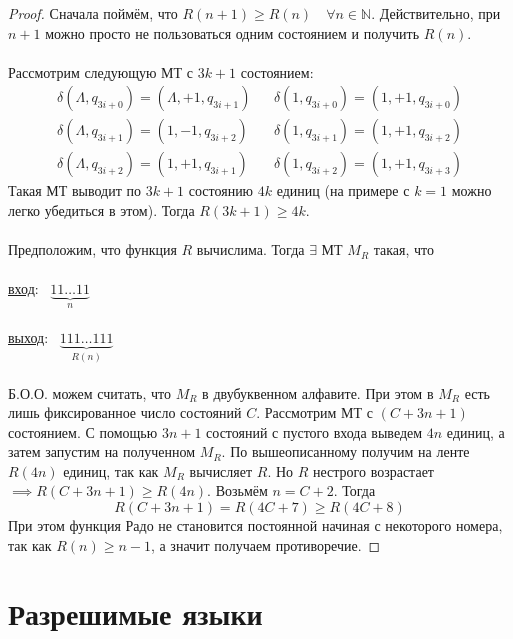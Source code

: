 \documentclass[11pt]{article}
\begin{document}
\begin{proof}
  Сначала поймём, что $R(n + 1) \geq R(n) \quad \forall n \in \mathbb{N}$. 
  Действительно, при $n + 1$ можно просто не пользоваться одним состоянием 
  и получить $R(n)$. \\ \\
  Рассмотрим следующую МТ с $3k + 1$ состоянием:
  \[\begin{array}{lll}
    \delta (\varLambda, q_{3i + 0}) = (\varLambda, +1, q_{3i + 1}) & & 
    \delta (1, q_{3i + 0}) = (1, +1, q_{3i + 0}) \\
    \delta (\varLambda, q_{3i + 1}) = (1, -1, q_{3i + 2}) & &
    \delta (1, q_{3i + 1}) = (1, +1, q_{3i + 2}) \\
    \delta (\varLambda, q_{3i + 2}) = (1, +1, q_{3i + 1}) & & 
    \delta (1, q_{3i + 2}) = (1, +1, q_{3i + 3})
  \end{array}\]
  Такая МТ выводит по $3k + 1$ состоянию $4k$ единиц (на примере с $k = 1$ 
  можно легко убедиться в этом). Тогда $R(3k + 1) \geq 4k$. \\ \\
  Предположим, что функция $R$ вычислима. Тогда $\exists$ МТ $M_R$ такая, что \\ \\
  \underline{вход}: \ $\underbrace{11 \ldots 11}_{n}$ \\ \\
  \underline{выход}: \ $\underbrace{111 \ldots 111}_{R(n)}$ \\ \\
  Б.О.О. можем считать, что $M_R$ в двубуквенном алфавите. При этом в $M_R$ 
  есть лишь фиксированное число состояний $C$. Рассмотрим МТ с $(C + 3n + 1)$ 
  состоянием. С помощью $3n + 1$ состояний с пустого входа выведем $4n$ единиц, 
  а затем запустим на полученном $M_R$. По вышеописанному получим на ленте 
  $R(4n)$ единиц, так как $M_R$ вычисляет $R$. Но $R$ нестрого возрастает 
  $\implies R(C + 3n + 1) \geq R(4n)$. Возьмём $n = C + 2$. Тогда
  \[R(C + 3n + 1) = R(4C + 7) \geq R(4C + 8)\] 
  При этом функция Радо не становится постоянной начиная с некоторого номера, 
  так как $R(n) \geq n - 1$, а значит получаем противоречие.
\end{proof}

\section{Разрешимые языки}
\end{document}
